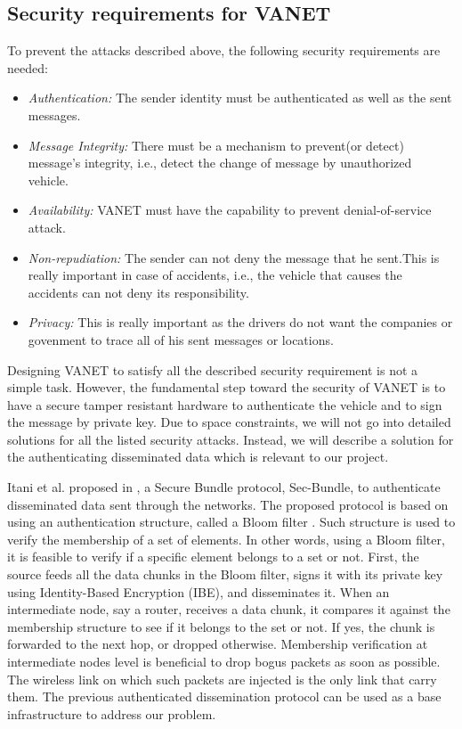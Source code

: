 \documentclass{IEEEtran}
\begin{document}
\subsection{Security requirements for VANET}

To prevent the attacks described above, the following security requirements are needed:
\begin{itemize}
\item \emph{Authentication:} The sender identity must be authenticated as well as the sent messages.
\item \emph{Message Integrity:} There must be a mechanism to prevent(or detect) message’s integrity, i.e., detect the change of message by unauthorized vehicle.
\item \emph{Availability:} VANET must have the capability to prevent denial-of-service attack.
\item \emph{Non-repudiation:} The sender can not deny the message that he sent.This is really important in case of accidents, i.e., the vehicle that causes the accidents can not deny its responsibility.
\item \emph{Privacy:} This is really important as the drivers do not want the companies or govenment to trace all of his sent messages or locations.
\end{itemize}
Designing VANET to satisfy all the described security requirement is not a simple task. However, the fundamental step toward the security of VANET is to have a secure tamper resistant hardware to authenticate the vehicle and to sign the message by private key. Due to space constraints, we will not go into detailed solutions for all the listed security attacks. Instead, we will describe a solution for the authenticating disseminated data which is relevant to our project.

Itani et al. proposed in \cite{slow}, a Secure Bundle protocol, Sec-Bundle, to authenticate disseminated data sent through the networks. The proposed protocol is based on using an authentication structure, called a Bloom filter \cite{bloomF}. Such structure is used to verify the membership of a set of elements. In other words, using a Bloom filter, it is feasible to verify if a specific element belongs to a set or not. First, the source feeds all the data chunks in the Bloom filter, signs it with its private key using Identity-Based Encryption (IBE), and disseminates it. When an intermediate node, say a router, receives a data chunk, it compares it against the membership structure to see if it belongs to the set or not. If yes, the chunk is forwarded to the next hop, or dropped otherwise. Membership verification at intermediate nodes level is beneficial to drop bogus packets as soon as possible. The wireless link on which such packets are injected is the only link that carry them. The previous authenticated dissemination protocol can be used as a base infrastructure to address our problem.
\end{document}
